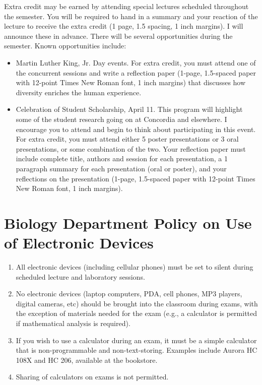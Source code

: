 \documentclass{tufte-handout}
\begin{document}
\begin{fullwidth}
Extra credit may be earned by attending special lectures scheduled throughout the semester.  You will be required to hand in a summary and your reaction of the lecture to receive the extra credit (1 page, 1.5 spacing, 1 inch margins).  I will announce these in advance.  There will be several opportunities during the semester.  Known opportunities include:

\begin{itemize}
\item Martin Luther King, Jr. Day events. For extra credit, you must attend one of the concurrent sessions and write a reflection paper (1-page, 1.5-spaced paper with 12-point Times New Roman font, 1 inch margins) that discusses how diversity enriches the human experience. 
\item Celebration of Student Scholarship, April 11.  This program will highlight some of the student research going on at Concordia and elsewhere.  I encourage you to attend and begin to think about participating in this event. For extra credit, you must attend either 5 poster presentations or 3 oral presentations, or some combination of the two.  Your reflection paper must include complete title, authors and session for each presentation, a 1 paragraph summary for each presentation (oral or poster), and your reflections on the presentation (1-page, 1.5-spaced paper with 12-point Times New Roman font, 1 inch margins).  	
\end{itemize}

\section{Biology Department Policy on Use of Electronic Devices}

\begin{enumerate}
\item All electronic devices (including cellular phones) must be set to silent during scheduled lecture and laboratory sessions.
\item No electronic devices (laptop computers, PDA, cell phones, MP3 players, digital cameras, etc) should be brought into the classroom during exams, with the exception of materials needed for the exam (e.g., a calculator is permitted if mathematical analysis is required).
\item If you wish to use a calculator during an exam, it must be a simple calculator that is non-programmable and non-text-storing. Examples include Aurora HC 108X and HC 206, available at the bookstore. 
\item Sharing of calculators on exams is not permitted.
\end{enumerate}


\end{fullwidth}
\end{document}
